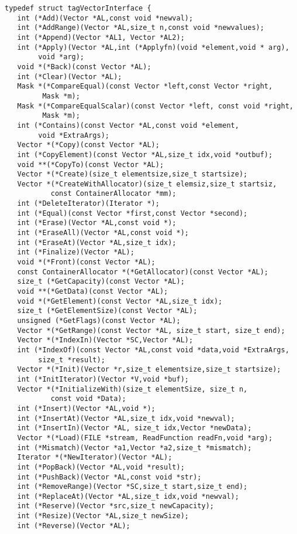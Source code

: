 \begin{verbatim}
typedef struct tagVectorInterface {
   int (*Add)(Vector *AL,const void *newval);
   int (*AddRange)(Vector *AL,size_t n,const void *newvalues);
   int (*Append)(Vector *AL1, Vector *AL2);
   int (*Apply)(Vector *AL,int (*Applyfn)(void *element,void * arg),
        void *arg);
   void *(*Back)(const Vector *AL);
   int (*Clear)(Vector *AL);
   Mask *(*CompareEqual)(const Vector *left,const Vector *right,
         Mask *m);
   Mask *(*CompareEqualScalar)(const Vector *left, const void *right,
         Mask *m);
   int (*Contains)(const Vector *AL,const void *element,
        void *ExtraArgs);
   Vector *(*Copy)(const Vector *AL);
   int (*CopyElement)(const Vector *AL,size_t idx,void *outbuf);
   void **(*CopyTo)(const Vector *AL);
   Vector *(*Create)(size_t elementsize,size_t startsize);
   Vector *(*CreateWithAllocator)(size_t elemsiz,size_t startsiz,
           const ContainerAllocator *mm);
   int (*DeleteIterator)(Iterator *);
   int (*Equal)(const Vector *first,const Vector *second);
   int (*Erase)(Vector *AL,const void *);
   int (*EraseAll)(Vector *AL,const void *);
   int (*EraseAt)(Vector *AL,size_t idx);
   int (*Finalize)(Vector *AL);
   void *(*Front)(const Vector *AL);
   const ContainerAllocator *(*GetAllocator)(const Vector *AL);
   size_t (*GetCapacity)(const Vector *AL);
   void **(*GetData)(const Vector *AL);
   void *(*GetElement)(const Vector *AL,size_t idx);
   size_t (*GetElementSize)(const Vector *AL);
   unsigned (*GetFlags)(const Vector *AL);
   Vector *(*GetRange)(const Vector *AL, size_t start, size_t end);
   Vector *(*IndexIn)(Vector *SC,Vector *AL);
   int (*IndexOf)(const Vector *AL,const void *data,void *ExtraArgs,
        size_t *result);
   Vector *(*Init)(Vector *r,size_t elementsize,size_t startsize);
   int (*InitIterator)(Vector *V,void *buf);
   Vector *(*InitializeWith)(size_t elementSize, size_t n,
           const void *Data);
   int (*Insert)(Vector *AL,void *);
   int (*InsertAt)(Vector *AL,size_t idx,void *newval);
   int (*InsertIn)(Vector *AL, size_t idx,Vector *newData);
   Vector *(*Load)(FILE *stream, ReadFunction readFn,void *arg);
   int (*Mismatch)(Vector *a1,Vector *a2,size_t *mismatch);
   Iterator *(*NewIterator)(Vector *AL);
   int (*PopBack)(Vector *AL,void *result);
   int (*PushBack)(Vector *AL,const void *str);
   int (*RemoveRange)(Vector *SC,size_t start,size_t end);
   int (*ReplaceAt)(Vector *AL,size_t idx,void *newval);
   int (*Reserve)(Vector *src,size_t newCapacity);
   int (*Resize)(Vector *AL,size_t newSize);
   int (*Reverse)(Vector *AL);

\end{verbatim}
